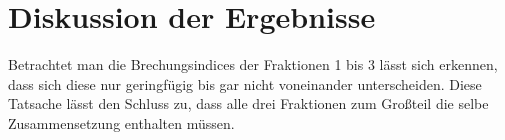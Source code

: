 \section{Diskussion der Ergebnisse}
\label{sec:diskussion}

Betrachtet man die Brechungsindices der Fraktionen 1 bis 3 lässt sich erkennen, dass sich diese nur geringfügig bis gar nicht voneinander unterscheiden. Diese Tatsache lässt den Schluss zu, dass alle drei Fraktionen zum Großteil die selbe Zusammensetzung enthalten müssen.